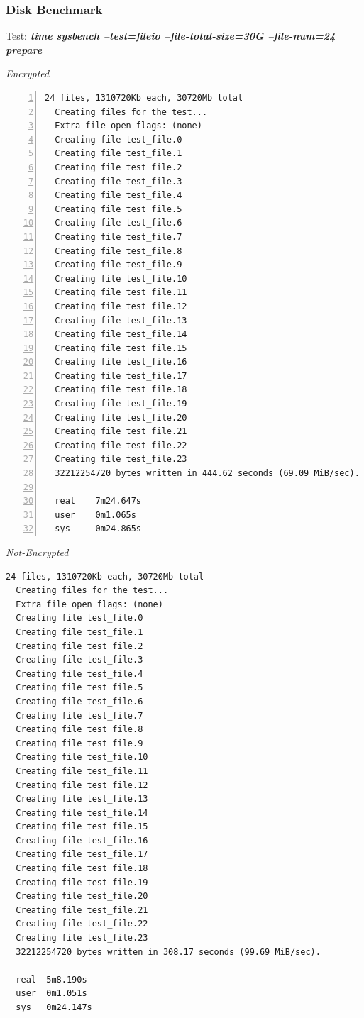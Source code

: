 \subsubsection{Disk Benchmark}
\begin{center}
  Test: \textbf{\textit{time sysbench --test=fileio --file-total-size=30G --file-num=24 prepare}}  
\end{center}
\vspace*{-\baselineskip}
\noindent\begin{minipage}[t]{0.45\linewidth}
  \centering
  \textit{Encrypted}
  \begin{lstlisting}[basicstyle=\tiny,frame=single, numbers=left, label=cpu_test1]
  24 files, 1310720Kb each, 30720Mb total
  Creating files for the test...
  Extra file open flags: (none)
  Creating file test_file.0
  Creating file test_file.1
  Creating file test_file.2
  Creating file test_file.3
  Creating file test_file.4
  Creating file test_file.5
  Creating file test_file.6
  Creating file test_file.7
  Creating file test_file.8
  Creating file test_file.9
  Creating file test_file.10
  Creating file test_file.11
  Creating file test_file.12
  Creating file test_file.13
  Creating file test_file.14
  Creating file test_file.15
  Creating file test_file.16
  Creating file test_file.17
  Creating file test_file.18
  Creating file test_file.19
  Creating file test_file.20
  Creating file test_file.21
  Creating file test_file.22
  Creating file test_file.23
  32212254720 bytes written in 444.62 seconds (69.09 MiB/sec).
  
  real    7m24.647s
  user    0m1.065s
  sys     0m24.865s
  \end{lstlisting}
\end{minipage}
\hspace{0.5cm}
\noindent\begin{minipage}[t]{0.45\linewidth}
  \centering
  \textit{Not-Encrypted}
  \begin{lstlisting}[basicstyle=\tiny,frame=single, label=cpu_test2]
  24 files, 1310720Kb each, 30720Mb total
  Creating files for the test...
  Extra file open flags: (none)
  Creating file test_file.0
  Creating file test_file.1
  Creating file test_file.2
  Creating file test_file.3
  Creating file test_file.4
  Creating file test_file.5
  Creating file test_file.6
  Creating file test_file.7
  Creating file test_file.8
  Creating file test_file.9
  Creating file test_file.10
  Creating file test_file.11
  Creating file test_file.12
  Creating file test_file.13
  Creating file test_file.14
  Creating file test_file.15
  Creating file test_file.16
  Creating file test_file.17
  Creating file test_file.18
  Creating file test_file.19
  Creating file test_file.20
  Creating file test_file.21
  Creating file test_file.22
  Creating file test_file.23
  32212254720 bytes written in 308.17 seconds (99.69 MiB/sec).
  
  real	5m8.190s
  user	0m1.051s
  sys	0m24.147s
  \end{lstlisting}
\end{minipage}

